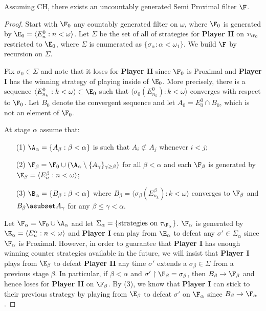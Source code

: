 \documentclass{article}
\begin{document}
\begin{prop}
    Assuming CH, there exists an uncountably generated Semi Proximal filter \(\F\).
\end{prop}
\begin{proof}
Start with \(\F_0\) any countably generated filter on \(\omega\), where \(\F_0\) is generated by \(\E_0 = \langle E_n^0:n < \omega\rangle\). Let \(\Sigma\) be the set of all of strategies for \textbf{Player II} on \(\tau_{\F_0}\) restricted to \(\E_0\), where \(\Sigma\) is enumerated as \(\{\sigma_{\alpha}:\alpha < \omega_1\}\). We build \(\F\) by recursion on \(\Sigma\).

Fix \(\sigma_0 \in \Sigma\) and note that it loses for \textbf{Player II} since \(\F_0\) is Proximal and \textbf{Player I} has the winning strategy of playing inside of \(\E_0\). More precisely, there is a sequence \(\langle E_{n_k}^0: k < \omega \rangle \subset \E_0\) such that \(\langle \sigma_0\left(E_{n_k}^0\right):k < \omega\rangle\) converges with respect to \(\F_0\). Let \(B_0\) denote the convergent sequence and  let \(A_0 = E_0^0\cap B_0\), which is not an element of \(\F_0\).

At stage \(\alpha\) assume that:
\begin{enumerate}
    \item[(1)] \(\A_{\alpha} = \{A_{\beta}:\beta < \alpha\}\) is such that \(A_i \not \subset A_j\) whenever \(i < j\);
    \item[(2)] \(\F_{\beta} = \F_0\cup\left(\A_{\alpha}\setminus\{A_{\gamma}\}_{\gamma \geq \beta}\right)\) for all \(\beta < \alpha\) and each \(\F_{\beta}\) is generated by \(\E_{\beta} =\langle E_n^{\beta}:n < \omega\rangle\);
    \item[(3)] \(\B_{\alpha} = \{B_{\beta}:\beta < \alpha\}\) where \(B_{\beta} = \langle \sigma_{\beta}(E_{n_k}^{\beta}):k < \omega\rangle\) converges to \(\F_{\beta}\) and \(B_{\beta} \asubset  A_{\gamma}\) for any \(\beta \leq \gamma < \alpha\).
\end{enumerate}
Let \(\F_{\alpha} = \F_0 \cup \A_{\alpha}\) and let \(\Sigma_{\alpha} = \{\text{strategies on $\tau_{\F_\alpha}$}\}\). \(\F_{\alpha}\) is  generated by \(\E_{\alpha} = \langle E_n^{\alpha}: n < \omega \rangle\) and \textbf{Player I} can play from \(\E_{\alpha}\) to defeat any \(\sigma' \in \Sigma_{\alpha}\) since \(\F_{\alpha}\) is Proximal. However, in order to guarantee that \textbf{Player I} has enough winning counter strategies available in the future, we will insist that \textbf{Player I} plays from \(\E_{\beta}\) to defeat \textbf{Player II} any time \(\sigma'\) extends a \(\sigma_{\beta} \in \Sigma\) from a previous stage \(\beta\).  In particular, if \(\beta < \alpha\) and \(\sigma'\upharpoonright \F_{\beta} = \sigma_{\beta}\), then \(B_{\beta}\to\F_{\beta}\) and hence loses for \textbf{Player II} on \(\F_{\beta}\). By (3), we know that \textbf{Player I} can stick to their previous strategy by playing from \(\E_{\beta}\) to defeat \(\sigma'\) on \(\F_{\alpha}\) since \(B_{\beta} \to \F_{\alpha}\).


\end{proof}
\end{document}

